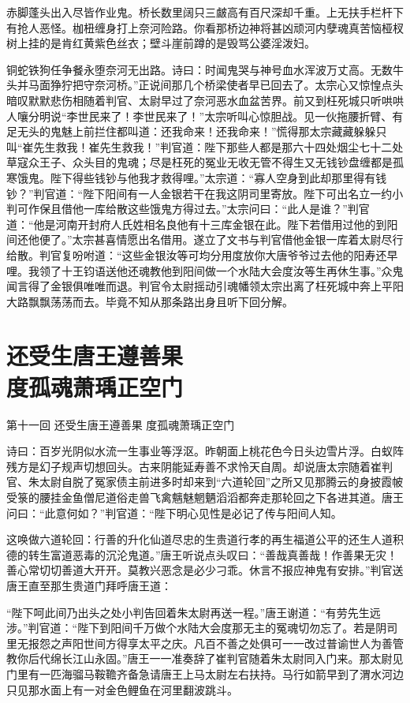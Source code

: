 \documentclass[12pt,UTF8]{ctexbook}
\begin{document}
{赤脚蓬头出入尽皆作业鬼。桥长数里阔只三皻高有百尺深却千重。上无扶手栏杆下有抢人恶怪。枷杻缠身打上奈河险路。你看那桥边神将甚凶顽河内孽魂真苦恼桠杈树上挂的是肯红黄紫色丝衣；壁斗崖前蹲的是毁骂公婆淫泼妇。

铜蛇铁狗任争餐永堕奈河无出路。诗曰：时闻鬼哭与神号血水浑波万丈高。无数牛头并马面狰狞把守奈河桥。”正说间那几个桥梁使者早已回去了。太宗心又惊惶点头暗叹默默悲伤相随着判官、太尉早过了奈河恶水血盆苦界。前又到枉死城只听哄哄人嚷分明说“李世民来了！李世民来了！”太宗听叫心惊胆战。见一伙拖腰折臂、有足无头的鬼魅上前拦住都叫道：还我命来！还我命来！”慌得那太宗藏藏躲躲只叫“崔先生救我！崔先生救我！”判官道：陛下那些人都是那六十四处烟尘七十二处草寇众王子、众头目的鬼魂；尽是枉死的冤业无收无管不得生又无钱钞盘缠都是孤寒饿鬼。陛下得些钱钞与他我才救得哩。”太宗道：“寡人空身到此却那里得有钱钞？”判官道：“陛下阳间有一人金银若干在我这阴司里寄放。陛下可出名立一约小判可作保且借他一库给散这些饿鬼方得过去。”太宗问曰：“此人是谁？”判官道：“他是河南开封府人氏姓相名良他有十三库金银在此。陛下若借用过他的到阳间还他便了。”太宗甚喜情愿出名借用。遂立了文书与判官借他金银一库着太尉尽行给散。判官复吩咐道：“这些金银汝等可均分用度放你大唐爷爷过去他的阳寿还早哩。我领了十王钧语送他还魂教他到阳间做一个水陆大会度汝等生再休生事。”众鬼闻言得了金银俱唯唯而退。判官令太尉摇动引魂幡领太宗出离了枉死城中奔上平阳大路飘飘荡荡而去。毕竟不知从那条路出身且听下回分解。

\chapter[还受生唐王遵善果\ 度孤魂萧瑀正空门]{还受生唐王遵善果\\度孤魂萧瑀正空门}

第十一回 还受生唐王遵善果 度孤魂萧瑀正空门

诗曰：百岁光阴似水流一生事业等浮沤。昨朝面上桃花色今日头边雪片浮。白蚁阵残方是幻子规声切想回头。古来阴能延寿善不求怜天自周。却说唐太宗随着崔判官、朱太尉自脱了冤家债主前进多时却来到“六道轮回”之所又见那腾云的身披霞帔受箓的腰挂金鱼僧尼道俗走兽飞禽魑魅魍魉滔滔都奔走那轮回之下各进其道。唐王问曰：“此意何如？”判官道：“陛下明心见性是必记了传与阳间人知。

这唤做六道轮回：行善的升化仙道尽忠的生贵道行孝的再生福道公平的还生人道积德的转生富道恶毒的沉沦鬼道。”唐王听说点头叹曰：“善哉真善哉！作善果无灾！善心常切切善道大开开。莫教兴恶念是必少刁乖。休言不报应神鬼有安排。”判官送唐王直至那生贵道门拜呼唐王道：

“陛下呵此间乃出头之处小判告回着朱太尉再送一程。”唐王谢道：“有劳先生远涉。”判官道：“陛下到阳间千万做个水陆大会度那无主的冤魂切勿忘了。若是阴司里无报怨之声阳世间方得享太平之庆。凡百不善之处俱可一一改过普谕世人为善管教你后代绵长江山永固。”唐王一一准奏辞了崔判官随着朱太尉同入门来。那太尉见门里有一匹海骝马鞍韂齐备急请唐王上马太尉左右扶持。马行如箭早到了渭水河边只见那水面上有一对金色鲤鱼在河里翻波跳斗。

}
\end{document}
